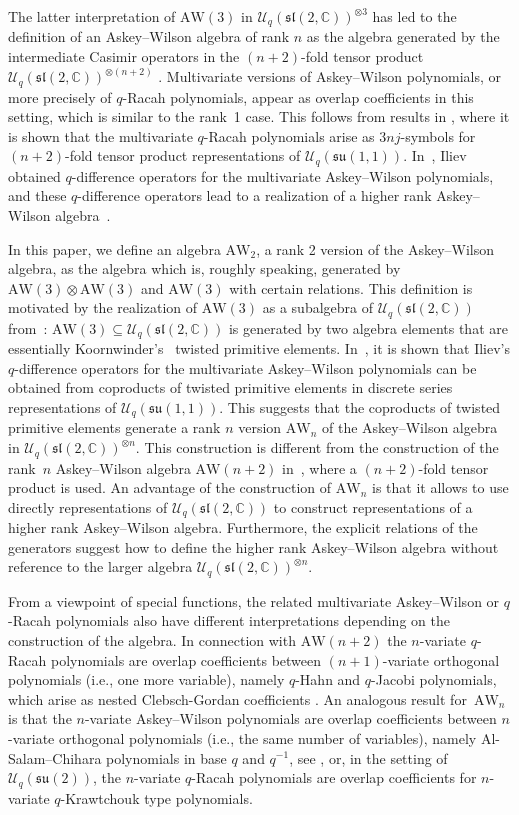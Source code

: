 \documentclass[10pt,a4paper]{amsart}
\numberwithin{equation}{section}
\newcommand{\CC}{\mathbb{C}}
\newcommand{\aw}{\mathrm{AW}\!\left(3\right)}
\newcommand{\AW}[1]{\mathrm{AW}_{#1}}
\newcommand{\slc}{\mathfrak{sl}(2,\CC)}
\newcommand{\Uq}{\mathcal{U}_q}
\begin{document}
The latter interpretation of $\aw$ in $\Uq(\slc)^{\otimes3}$ has led to the definition of an Askey--Wilson algebra of rank $n$ as the algebra generated by the intermediate Casimir operators in the $(n+2)$-fold tensor product $\Uq(\slc)^{\otimes(n+2)}$ \cite{CL, DeBie2021, DeBie2020, DeClercq19, Post2017}. Multivariate versions \cite{Gasper2005, Gasper2007} of Askey--Wilson polynomials, or more precisely of $q$-Racah polynomials, appear as overlap coefficients in this setting, which is similar to the rank~1 case. This follows from results in \cite{GIV}, where it is shown that the multivariate $q$-Racah polynomials arise as $3nj$-symbols for $(n+2)$-fold tensor product representations of $\Uq(\mathfrak{su}(1,1))$. In~\cite{Iliev2011}, Iliev obtained $q$-difference operators for the multivariate Askey--Wilson polynomials, and these $q$-difference operators lead to a realization of a higher rank Askey--Wilson algebra~\cite{DeBie2021}.

In this paper, we define an algebra $\AW{2}$, a rank 2 version of the Askey--Wilson algebra, as the algebra which is, roughly speaking, generated by $\aw\otimes\aw$ and $\aw$ with certain relations. This definition is motivated by the realization of $\aw$ as a subalgebra of $\Uq(\slc)$ from~\cite{Granovskii1993}: $\aw \subseteq \Uq(\slc)$ is generated by two algebra elements that are essentially Koornwinder's~\cite{Koornwinder1993} twisted primitive elements. In~\cite{Groenevelt2021}, it is shown that Iliev's $q$-difference operators for the multivariate Askey--Wilson polynomials can be obtained from coproducts of twisted primitive elements in discrete series representations of $\Uq(\mathfrak{su}(1,1))$. This suggests that the coproducts of twisted primitive elements generate a rank $n$ version $\AW{n}$ of the Askey--Wilson algebra in $\Uq(\slc)^{\otimes n}$. This construction is different from the construction of the rank~$n$ Askey--Wilson algebra $\mathrm{AW}(n+2)$ in~\cite{DeBie2020}, where a $(n+2)$-fold tensor product is used. An advantage of the construction of $\AW{n}$ is that it allows to use directly representations of $\Uq(\slc)$ to construct representations of a higher rank Askey--Wilson algebra. Furthermore, the explicit relations of the generators suggest how to define the higher rank Askey--Wilson algebra without reference to the larger algebra $\Uq(\slc)^{\otimes n}$.

From a viewpoint of special functions, the related multivariate Askey--Wilson or $q$-Racah polynomials also have different interpretations depending on the construction of the algebra. In connection with $\mathrm{AW}(n+2)$ the $n$-variate $q$-Racah polynomials are overlap coefficients between $(n+1)$-variate orthogonal polynomials (i.e., one more variable), namely $q$-Hahn and $q$-Jacobi polynomials, which arise as nested Clebsch-Gordan coefficients \cite{GIV}. An analogous result for~$\AW{n}$ is that the $n$-variate Askey--Wilson polynomials are overlap coefficients between $n$-variate orthogonal polynomials (i.e., the same number of variables), namely Al-Salam--Chihara polynomials in base $q$ and $q^{-1}$, see \cite{Groenevelt2021}, or, in the setting of $\Uq(\mathfrak{su}(2))$, the $n$-variate $q$-Racah polynomials are overlap coefficients for $n$-variate $q$-Krawtchouk type polynomials.
\end{document}
